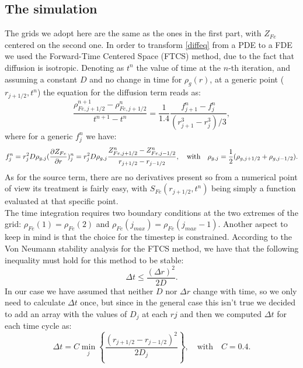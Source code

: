 \documentclass{article}
\begin{document}
\subsection{The simulation}
The grids we adopt here are the same as the ones in the first part, with $Z_{Fe}$ centered on the second one. In order to transform \eqref{diffeq} from a PDE to a FDE we used the Forward-Time Centered Space (FTCS) method, due to the fact that diffusion is isotropic.
Denoting as $t^{n}$ the value of time at the $n$-th iteration, and assuming a constant $D$ and no change in time for $\rho_{g}(r)$, at a generic point ($r_{j+1/2},t^{n}$) the equation for the diffusion term reads as:
\begin{equation}\label{fdediff}
	\frac{\rho_{Fe,j+1/2}^{n+1}-\rho_{Fe,j+1/2}^{n}}{t^{n+1}-t^{n}}=\frac{1}{1.4}\frac{f_{j+1}^{n}-f_{j}^{n}}{(r_{j+1}^{3}-r_{j}^{3})/3},
\end{equation}
where for a generic $f_{j}^{n}$ we have:
\begin{equation}\label{fnj}
	f_{j}^{n}=r_{j}^{2}D\rho_{g,j}(\pdv{Z_{Fe}}{r})^{n}_{j}=r_{j}^{2}D\rho_{g,j}\frac{Z_{Fe,j+1/2}^{n}-Z^{n}_{Fe,j-1/2}}{r_{j+1/2}-r_{j-1/2}},\quad \text{with} \quad \rho_{g,j}=\frac{1}{2}(\rho_{g,j+1/2}+\rho_{g,j-1/2}).
\end{equation}
As for the source term, there are no derivatives present so from a numerical point of view its treatment is fairly easy, with $S_{Fe}(r_{j+1/2},t^{n})$ being simply a function evaluated at that specific point.\\
The time integration requires two boundary conditions at the two extremes of the grid: $\rho_{Fe}(1)=\rho_{Fe}(2)$ and $\rho_{Fe}(j_{max})=\rho_{Fe}(j_{max}-1)$.
Another aspect to keep in mind is that the choice for the timestep is constrained. According to the Von Neumann stability analysis for the FTCS method, we have that the following inequality must hold for this method to be stable:
\begin{equation}\label{stability}
	\Delta t\le \frac{(\Delta r)^{2}}{2D}.
\end{equation}
In our case we have assumed that neither $D$ nor $\Delta r$ change with time, so we only need to calculate $\Delta t $ once, but since in the general case this isn't true we decided to add an array with the values of $D_{j}$ at each $r{j}$ and then we computed $\Delta t $ for each time cycle as:
\begin{equation}
	\Delta t=C\min_{j}\left\{\frac{(r_{j+1/2}-r_{j-1/2})^{2}}{2D_{j}}\right\},\quad \text{with} \quad C=0.4.
\end{equation}
\end{document}

